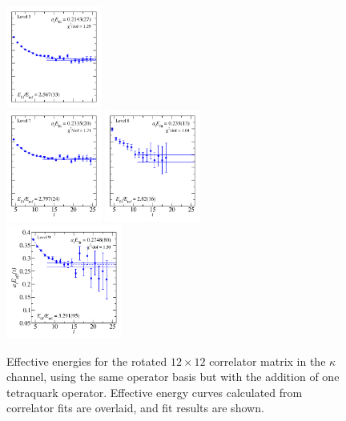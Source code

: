 \begin{figure}
  \includegraphics[width=0.28\textwidth]{figures/spectrum_a1g/with_tq/fits/fit_5.pdf}\\
  \includegraphics[width=0.28\textwidth]{figures/spectrum_a1g/with_tq/fits/fit_6.pdf}
  \includegraphics[width=0.28\textwidth]{figures/spectrum_a1g/with_tq/fits/fit_7.pdf}\\[-0.4cm]
  \includegraphics[width=0.34\textwidth]{figures/spectrum_a1g/with_tq/fits/fit_9.pdf}
  \caption{Effective energies for the rotated $12\times 12$ correlator matrix in the $\kappa$ channel, using the same operator basis but with the addition of one tetraquark operator. Effective energy curves calculated from correlator fits are overlaid, and fit results are shown.}
  \label{fig:kappa_with_tq_grid}
\end{figure}

